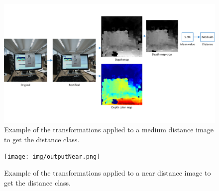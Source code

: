 \documentclass[10pt,a4paper,twocolumn,twoside]{article}
\begin{document}
	\begin{figure}
		\centering
		\includegraphics[width=1\linewidth]{img/outputMedium.png}
		\caption{Example of the transformations applied to a medium distance image to get the distance class.}
		\label{fig:add:pattern}
	\end{figure}

	\begin{figure}
		\centering
		\texttt{[image: img/outputNear.png]}
		\caption{Example of the transformations applied to a near distance image to get the distance class.}
		\label{fig:add:pattern}
	\end{figure}
	
\end{document}
